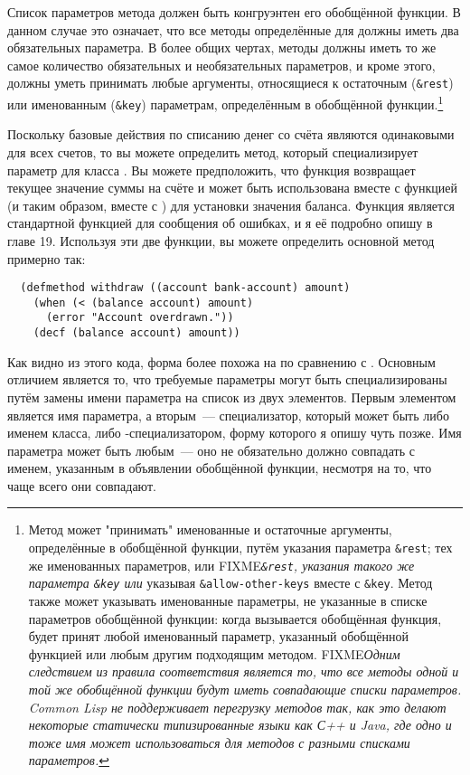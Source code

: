 Список параметров метода должен быть конгруэнтен его обобщённой функции.  В данном случае
это означает, что все методы определённые для  должны иметь два
обязательных параметра.  В более общих чертах, методы должны иметь то же самое количество
обязательных и необязательных параметров, и кроме этого, должны уметь принимать любые
аргументы, относящиеся к остаточным (\lstinline!&rest!) или именованным (\lstinline!&key!)
параметрам, определённым в обобщённой функции.\footnote{Метод может "принимать"
  именованные и остаточные аргументы, определённые в обобщённой функции, путём указания
  параметра \lstinline!&rest!; тех же именованных параметров, или
  FIXME\textit{\lstinline!&rest!, указания такого же параметра \lstinline!&key! или}
  указывая \lstinline!&allow-other-keys! вместе с \lstinline!&key!.  Метод также может
  указывать именованные параметры, не указанные в списке параметров обобщённой функции:
  когда вызывается обобщённая функция, будет принят любой именованный параметр, указанный
  обобщённой функцией или любым другим подходящим методом.  FIXME\textit{Одним следствием
    из правила соответствия является то, что все методы одной и той же обобщённой функции
    будут иметь совпадающие списки параметров.  Common Lisp не поддерживает перегрузку
    методов так, как это делают некоторые статически типизированные языки как С++ и Java,
    где одно и тоже имя может использоваться для методов с разными списками параметров.}
}

Поскольку базовые действия по списанию денег со счёта являются одинаковыми для всех
счетов, то вы можете определить метод, который специализирует параметр  для
класса .  Вы можете предположить, что функция  возвращает
текущее значение суммы на счёте и может быть использована вместе с функцией  (и
таким образом, вместе с ) для установки значения баланса.  Функция 
является стандартной функцией для сообщения об ошибках, и я её подробно опишу в главе 19.
Используя эти две функции, вы можете определить основной метод  примерно
так:

\begin{lstlisting}
  (defmethod withdraw ((account bank-account) amount)
    (when (< (balance account) amount)
      (error "Account overdrawn."))
    (decf (balance account) amount))
\end{lstlisting}

Как видно из этого кода, форма  более похожа на  по сравнению
с .  Основным отличием является то, что требуемые параметры могут быть
специализированы путём замены имени параметра на список из двух элементов.  Первым
элементом является имя параметра, а вторым~--- специализатор, который может быть либо
именем класса, либо -специализатором, форму которого я опишу чуть позже.  Имя
параметра может быть любым~--- оно не обязательно должно совпадать с именем, указанным в
объявлении обобщённой функции, несмотря на то, что чаще всего они совпадают.

